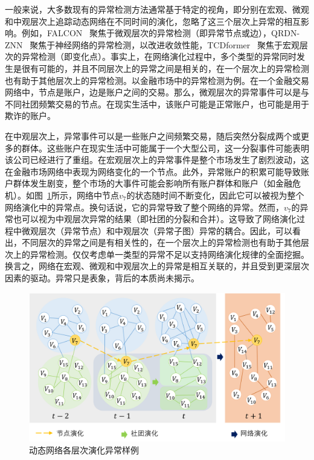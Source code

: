 一般来说，大多数现有的异常检测方法通常基于特定的视角，即分别在宏观、微观和中观层次上追踪动态网络在不同时间的演化，忽略了这三个层次上异常的相互影响。例如，FALCON~\cite{10597831} 聚焦于微观层次的异常检测（即异常节点或边），QRDN-ZNN~\cite{LI2025107412} 聚焦于神经网络的异常检测，以改进收敛性能，TCDformer~\cite{wan2024tcdformer} 聚焦于宏观层次的异常检测（即变化点）。事实上，在网络演化过程中，多个类型的异常同时发生是很有可能的，并且不同层次上的异常之间是相关的，在一个层次上的异常检测也有助于其他层次上的异常检测。以金融市场中的异常检测为例。在一个金融交易网络中，节点是账户，边是账户之间的交易。那么，微观层次的异常事件可以是与不同社团频繁交易的节点。在现实生活中，该账户可能是正常账户，也可能是用于欺诈的账户。


在中观层次上，异常事件可以是一些账户之间频繁交易，随后突然分裂成两个或更多的群体。这些账户在现实生活中可能属于一个大型公司，这一分裂事件可能表明该公司已经进行了重组。在宏观层次上的异常事件是整个市场发生了剧烈波动，这在金融市场网络中表现为网络变化的一个节点。此外，异常账户的积累可能导致账户群体发生剧变，整个市场的大事件可能会影响所有账户群体和账户（如金融危机）。如图~\ref{fig:example}所示，网络中节点$v_{7}$的状态随时间不断变化，因此它可以被视为整个网络演化中的异常点。换句话说，它的异常导致了整个网络的异常。然而，$v_{7}$的异常也可以视为中观层次异常的结果（即社团的分裂和合并）。这导致了网络演化过程中微观层次（异常节点）和中观层次（异常子图）异常的耦合。因此，可以看出，不同层次的异常之间是有相关性的，在一个层次上的异常检测也有助于其他层次上的异常检测。仅仅考虑单一类型的异常不足以支持网络演化规律的全面挖掘。换言之，网络在宏观、微观和中观层次上的异常是相互关联的，并且受到更深层次因素的驱动。异常只是表象，背后的本质尚未揭示。

\begin{figure}[htbp]
    \centering
    \includegraphics[width=.85\linewidth,trim=0.1in 0.5in 0.1in 0.1in]{figures/chap05/chap5motivation.png}
    \caption{动态网络各层次演化异常样例}
    \label{fig:example}
\end{figure} 





